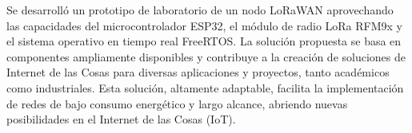 
Se desarrolló un prototipo de laboratorio de un nodo LoRaWAN aprovechando las capacidades del microcontrolador ESP32, el módulo de radio LoRa RFM9x y el sistema operativo en tiempo real FreeRTOS. La solución propuesta se basa en componentes ampliamente disponibles y contribuye a la creación de soluciones de Internet de las Cosas para diversas aplicaciones y proyectos, tanto académicos como industriales. Esta solución, altamente adaptable, facilita la implementación de redes de bajo consumo energético y largo alcance, abriendo nuevas posibilidades en el Internet de las Cosas (IoT).